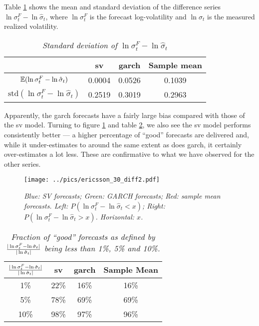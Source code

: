 Table \ref{tab:ericsson_30_diff1} shows the mean and standard
deviation of the difference series $\ln\sigma^F_t -
\ln\hat{\sigma}_t$, where $\ln\sigma^F_t$ is the forecast
log-volatility and $\ln\hat{\sigma}_t$ is the measured realized
volatility.
\begin{table}[htb!]
  \centering
  \begin{tabular}{|c|c|c|c|}
    \hline
    & \gls{sv} & \gls{garch} & Sample mean \\
    \hline
    $\mathbb{E}(\ln \sigma^F_t - \ln \hat{\sigma}_t)$ & 0.0004 &
    0.0526 & 0.1039 \\
    \hline
    $\text{std}(\ln \sigma^F_t - \ln \hat{\sigma}_t)$ & 0.2519 &
    0.3019 & 0.2963 \\
    \hline
  \end{tabular}
  \caption{\small \it Standard deviation of $\ln\sigma^F_t -
    \ln\hat{\sigma}_t$}
  \label{tab:ericsson_30_diff1}
\end{table}
Apparently, the \gls{garch} forecasts have a fairly large bias compared with
those of the \gls{sv} model. Turning to figure \ref{fig:ericsson_30_diff2}
and table \ref{tab:ericsson_30_diff3}, we also see the \gls{sv} model
performs consistently better --- a higher percentage of ``good''
forecasts are delivered and, while it under-estimates to around the
same extent as does \gls{garch}, it certainly over-estimates a lot
less. These are confirmative to what we have observed for the other
series.
\begin{figure}[htb!]
  \centering
    \texttt{[image: ../pics/ericsson\_30\_diff2.pdf]}
  \caption{\small \it Blue: SV forecasts; Green: GARCH forecasts; Red:
    sample mean forecasts. Left: $P(\ln \sigma^F_t - \ln \hat{\sigma}_t < x)$;
    Right: $P(\ln \sigma^F_t - \ln \hat{\sigma}_t > x)$. Horizontal: $x$.}
  \label{fig:ericsson_30_diff2}
\end{figure}

\begin{table}[htb!]
  \centering
  \begin{tabular}{|c|c|c|c|}
    \hline
    ${|\ln \sigma^F_t - \ln \hat{\sigma}_t| \over |\ln
      \hat{\sigma}_t|}$ &
    \gls{sv} & \gls{garch} & Sample Mean \\
    \hline
    1\% & 22\% & 16\% & 16\% \\
    \hline
    5\% & 78\% & 69\% & 69\% \\
    \hline
    10\% & 98\% & 97\% & 96\% \\
    \hline
  \end{tabular}
  \caption{\small \it Fraction of ``good'' forecasts as defined by
    ${|\ln \sigma^F_t - \ln \hat{\sigma}_t| \over |\ln
      \hat{\sigma}_t|}$ being less than 1\%, 5\% and 10\%.}
  \label{tab:ericsson_30_diff3}
\end{table}

